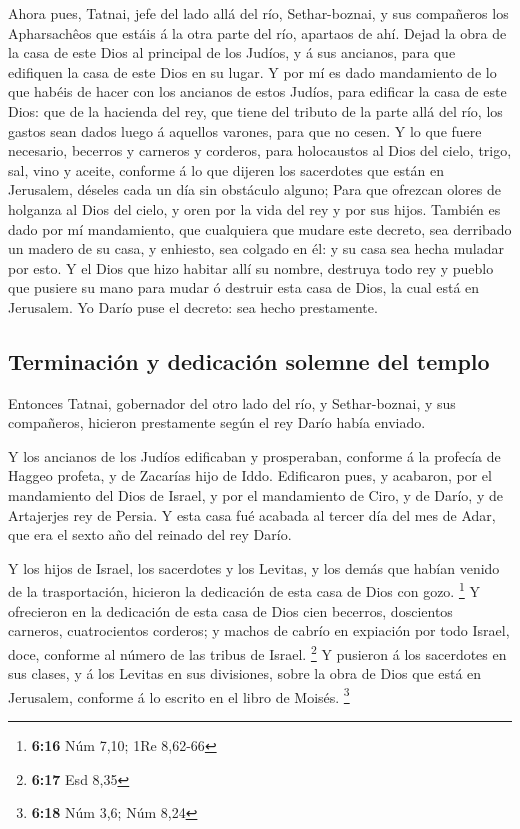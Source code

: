  Ahora pues, Tatnai, jefe del lado allá del río,
Sethar-boznai, y sus compañeros los Apharsachêos que estáis á la otra
parte del río, apartaos de ahí.  Dejad la obra de la casa
de este Dios al principal de los Judíos, y á sus ancianos, para que
edifiquen la casa de este Dios en su lugar.  Y por mí es
dado mandamiento de lo que habéis de hacer con los ancianos de estos
Judíos, para edificar la casa de este Dios: que de la hacienda del rey,
que tiene del tributo de la parte allá del río, los gastos sean dados
luego á aquellos varones, para que no cesen.  Y lo que
fuere necesario, becerros y carneros y corderos, para holocaustos al
Dios del cielo, trigo, sal, vino y aceite, conforme á lo que dijeren los
sacerdotes que están en Jerusalem, déseles cada un día sin obstáculo
alguno;  Para que ofrezcan olores de holganza al Dios del
cielo, y oren por la vida del rey y por sus hijos. 
También es dado por mí mandamiento, que cualquiera que mudare este
decreto, sea derribado un madero de su casa, y enhiesto, sea colgado en
él: y su casa sea hecha muladar por esto.  Y el Dios que
hizo habitar allí su nombre, destruya todo rey y pueblo que pusiere su
mano para mudar ó destruir esta casa de Dios, la cual está en Jerusalem.
Yo Darío puse el decreto: sea hecho prestamente.

\hypertarget{terminaciuxf3n-y-dedicaciuxf3n-solemne-del-templo}{%
\subsection{Terminación y dedicación solemne del
templo}\label{terminaciuxf3n-y-dedicaciuxf3n-solemne-del-templo}}

 Entonces Tatnai, gobernador del otro lado del río, y
Sethar-boznai, y sus compañeros, hicieron prestamente según el rey Darío
había enviado.

 Y los ancianos de los Judíos edificaban y prosperaban,
conforme á la profecía de Haggeo profeta, y de Zacarías hijo de Iddo.
Edificaron pues, y acabaron, por el mandamiento del Dios de Israel, y
por el mandamiento de Ciro, y de Darío, y de Artajerjes rey de Persia.
 Y esta casa fué acabada al tercer día del mes de Adar,
que era el sexto año del reinado del rey Darío.

 Y los hijos de Israel, los sacerdotes y los Levitas, y
los demás que habían venido de la trasportación, hicieron la dedicación
de esta casa de Dios con gozo. \footnote{\textbf{6:16} Núm 7,10; 1Re
  8,62-66}  Y ofrecieron en la dedicación de esta casa de
Dios cien becerros, doscientos carneros, cuatrocientos corderos; y
machos de cabrío en expiación por todo Israel, doce, conforme al número
de las tribus de Israel. \footnote{\textbf{6:17} Esd 8,35}
 Y pusieron á los sacerdotes en sus clases, y á los
Levitas en sus divisiones, sobre la obra de Dios que está en Jerusalem,
conforme á lo escrito en el libro de Moisés. \footnote{\textbf{6:18} Núm
  3,6; Núm 8,24}

